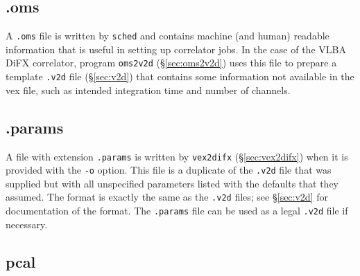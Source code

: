 
\subsection{.oms} \label{sec:oms}

A {\tt .oms} file is written by {\tt sched} and contains machine (and human) readable information that is useful in setting up correlator jobs.
In the case of the VLBA DiFX correlator, program {\tt oms2v2d} (\S\ref{sec:oms2v2d}) uses this file to prepare a template {\tt .v2d} file (\S\ref{sec:v2d}) that contains some information not available in the vex file, such as intended integration time and number of channels.









\subsection{.params} \label{sec:params}

A file with extension {\tt .params} is written by {\tt vex2difx} (\S\ref{sec:vex2difx}) when it is provided with the {\tt -o} option.
This file is a duplicate of the {\tt .v2d} file that was supplied but with all unspecified parameters listed with the defaults that they assumed.
The format is exactly the same as the {\tt .v2d} files; see \S\ref{sec:v2d} for documentation of the format.
The {\tt .params} file can be used as a legal {\tt .v2d} file if necessary.








\subsection{pcal} \label{sec:pcal}

